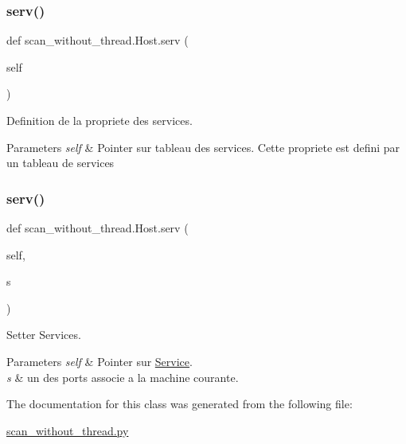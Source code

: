 \subsubsection{\texorpdfstring{serv()}{serv()}\hspace{0.1cm}{\footnotesize\ttfamily [1/2]}}
{\footnotesize\ttfamily def scan\+\_\+without\+\_\+thread.\+Host.\+serv (\begin{DoxyParamCaption}\item[{}]{self }\end{DoxyParamCaption})}



Definition de la propriete des services. 


\begin{DoxyParams}{Parameters}
{\em self} & Pointer sur tableau des services. Cette propriete est defini par un tableau de services \\
\hline
\end{DoxyParams}
\hypertarget{classscan__without__thread_1_1Host_a3fc58e338857c5ba6e4725b90a538266}{}\label{classscan__without__thread_1_1Host_a3fc58e338857c5ba6e4725b90a538266} 
\subsubsection{\texorpdfstring{serv()}{serv()}\hspace{0.1cm}{\footnotesize\ttfamily [2/2]}}
{\footnotesize\ttfamily def scan\+\_\+without\+\_\+thread.\+Host.\+serv (\begin{DoxyParamCaption}\item[{}]{self,  }\item[{}]{s }\end{DoxyParamCaption})}



Setter Services. 


\begin{DoxyParams}{Parameters}
{\em self} & Pointer sur \hyperlink{classscan__without__thread_1_1Service}{Service}. \\
\hline
{\em s} & un des ports associe a la machine courante. \\
\hline
\end{DoxyParams}


The documentation for this class was generated from the following file\+:\begin{DoxyCompactItemize}
\item 
\hyperlink{scan__without__thread_8py}{scan\+\_\+without\+\_\+thread.\+py}\end{DoxyCompactItemize}
